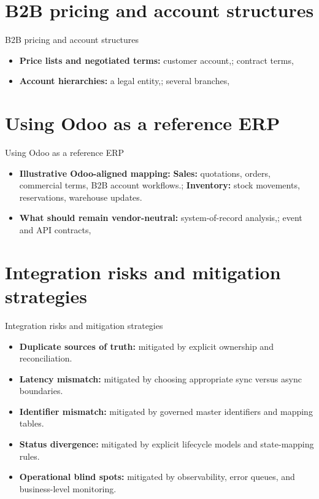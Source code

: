 \documentclass[aspectratio=169]{beamer}
\begin{document}
\section{B2B pricing and account structures}

\begin{frame}{B2B pricing and account structures}
  \begin{itemize}
    \item \textbf{Price lists and negotiated terms:} customer account,; contract terms,
    \item \textbf{Account hierarchies:} a legal entity,; several branches,
  \end{itemize}
\end{frame}

\section{Using Odoo as a reference ERP}

\begin{frame}{Using Odoo as a reference ERP}
  \begin{itemize}
    \item \textbf{Illustrative Odoo-aligned mapping:} \textbf{Sales:} quotations, orders, commercial terms, B2B account workflows.; \textbf{Inventory:} stock movements, reservations, warehouse updates.
    \item \textbf{What should remain vendor-neutral:} system-of-record analysis,; event and API contracts,
  \end{itemize}
\end{frame}

\section{Integration risks and mitigation strategies}

\begin{frame}{Integration risks and mitigation strategies}
  \begin{itemize}
    \item \textbf{Duplicate sources of truth:} mitigated by explicit ownership and reconciliation.
    \item \textbf{Latency mismatch:} mitigated by choosing appropriate sync versus async boundaries.
    \item \textbf{Identifier mismatch:} mitigated by governed master identifiers and mapping tables.
    \item \textbf{Status divergence:} mitigated by explicit lifecycle models and state-mapping rules.
    \item \textbf{Operational blind spots:} mitigated by observability, error queues, and business-level monitoring.
  \end{itemize}
\end{frame}
\end{document}
